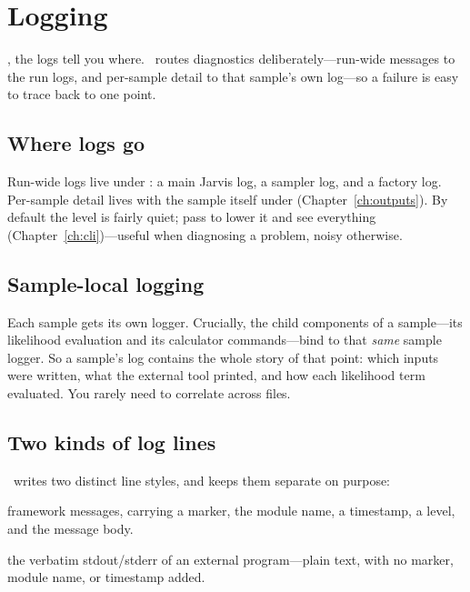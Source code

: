 \chapter{Logging}
\label{ch:logging}

, the logs tell you where. \Jarvis\ routes diagnostics
deliberately---run-wide messages to the run logs, and per-sample detail to that sample's own
log---so a failure is easy to trace back to one point.

\section{Where logs go}
\label{sec:log-where}

Run-wide logs live under : a main Jarvis log, a sampler log, and a factory log.
Per-sample detail lives with the sample itself under  (Chapter~\ref{ch:outputs}).
By default the level is fairly quiet; pass  to lower it and see everything
(Chapter~\ref{ch:cli})---useful when diagnosing a problem, noisy otherwise.

\section{Sample-local logging}
\label{sec:log-sample}

Each sample gets its own logger. Crucially, the child components of a sample---its likelihood
evaluation and its calculator commands---bind to that \emph{same} sample logger. So a sample's
log contains the whole story of that point: which inputs were written, what the external tool
printed, and how each likelihood term evaluated. You rarely need to correlate across files.

\section{Two kinds of log lines}
\label{sec:log-kinds}

\Jarvis\ writes two distinct line styles, and keeps them separate on purpose:

\begin{description}[style=nextline, leftmargin=1.2em]
  \item[Structured records] framework messages, carrying a marker, the module name, a timestamp, a
        level, and the message body.
  \item[Raw stream lines] the verbatim stdout/stderr of an external program---plain text, with no
        marker, module name, or timestamp added.
\end{description}

